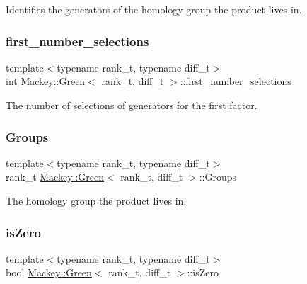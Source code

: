 Identifies the generators of the homology group the product lives in. 

\mbox{\label{classMackey_1_1Green_a18ba76e7f7b71c1e5fca23bc71accf86}} 
\subsubsection{\texorpdfstring{first\+\_\+number\+\_\+selections}{first\_number\_selections}}
{\footnotesize\ttfamily template$<$typename rank\+\_\+t, typename diff\+\_\+t$>$ \\
int \hyperlink{classMackey_1_1Green}{Mackey\+::\+Green}$<$ rank\+\_\+t, diff\+\_\+t $>$\+::first\+\_\+number\+\_\+selections}



The number of selections of generators for the first factor. 

\mbox{\label{classMackey_1_1Green_acfa5ea708949024bd24f1c1e21399cbc}} 
\subsubsection{\texorpdfstring{Groups}{Groups}}
{\footnotesize\ttfamily template$<$typename rank\+\_\+t, typename diff\+\_\+t$>$ \\
rank\+\_\+t \hyperlink{classMackey_1_1Green}{Mackey\+::\+Green}$<$ rank\+\_\+t, diff\+\_\+t $>$\+::Groups}



The homology group the product lives in. 

\mbox{\label{classMackey_1_1Green_a12a01a6d1715538af0bdc6b34fad6b85}} 
\subsubsection{\texorpdfstring{is\+Zero}{isZero}}
{\footnotesize\ttfamily template$<$typename rank\+\_\+t, typename diff\+\_\+t$>$ \\
bool \hyperlink{classMackey_1_1Green}{Mackey\+::\+Green}$<$ rank\+\_\+t, diff\+\_\+t $>$\+::is\+Zero}



